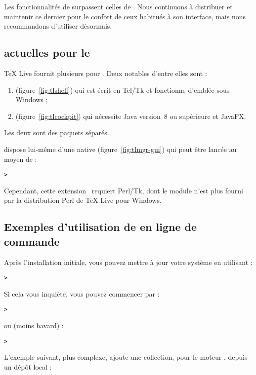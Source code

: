 \documentclass[german, english, french]{article}
\renewcommand{\TL}{\TeX{} Live\xspace}%
\begin{document}
Les fonctionnalités de  surpassent celles de . Nous
continuons à distribuer et maintenir ce dernier pour le confort de ceux habitués
à son interface, mais nous recommandons d'utiliser  désormais.

\subsection{\GUI{} actuelles pour le }

\TL{} fournit plusieurs \GUI{} pour . Deux notables d'entre elles
sont :
\begin{enumerate}
\item {} (figure~\ref{fig:tlshell}) qui est écrit en Tcl/Tk et
  fonctionne d'emblée sous Windows ;
\item {} (figure~\ref{fig:tlcockpit}) qui nécessite Java version~8
  ou supérieure et JavaFX.
\end{enumerate}
Les deux sont des paquets séparés.

 dispose lui-même d'une \GUI{} native (figure~\ref{fig:tlmgr-gui})
qui peut être lancée au moyen de :
\begin{alltt}
> 
\end{alltt}
Cependant, cette extension \GUI\ requiert Perl/Tk, dont le module n'est plus
fourni par la distribution Perl de \TL{} pour Windows.

\subsection{Exemples d'utilisation de  en ligne de commande}

Après l'installation initiale, vous pouvez mettre à jour votre système en
utilisant :

\begin{alltt}
> 
\end{alltt}
Si cela vous inquiète, vous pouvez commencer par :
\begin{alltt}
> 
\end{alltt}
ou (moins bavard) :
\begin{alltt}
> 
\end{alltt}

L'exemple suivant, plus complexe, ajoute une collection, pour le moteur \XeTeX,
depuis un dépôt local :
\end{document}
